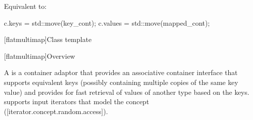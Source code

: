 \begin{addedblock}
\begin{itemdescr}
\pnum
\effects Equivalent to:
\begin{codeblock}
c.keys = std::move(key_cont);
c.values = std::move(mapped_cont);
\end{codeblock}
\end{itemdescr}


[flatmultimap]{Class template }

[flatmultimap]{Overview}

\pnum
{}%
A  is a container adaptor that provides an associative
container interface that supports equivalent keys (possibly containing
multiple copies of the same key value) and provides for fast retrieval of
values of another type  based on the keys. 
supports input iterators that model the
 concept ([iterator.concept.random.access]).


\end{addedblock}
